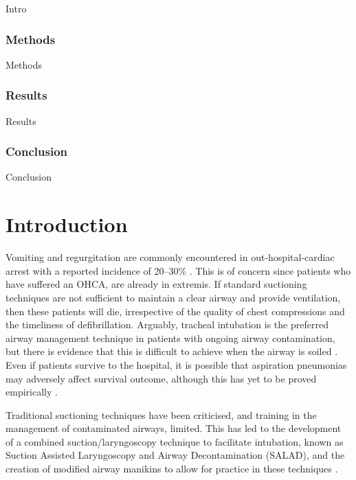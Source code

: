\documentclass[]{article}
\begin{document}
Intro

\hypertarget{methods}{%
\subsubsection{Methods}\label{methods}}

Methods

\hypertarget{results}{%
\subsubsection{Results}\label{results}}

Results

\hypertarget{conclusion}{%
\subsubsection{Conclusion}\label{conclusion}}

Conclusion

\hypertarget{intro}{%
\section{Introduction}\label{intro}}

Vomiting and regurgitation are commonly encountered in
out-hospital-cardiac arrest with a reported incidence of 20--30\%
\citep{voss_how_2014, simons_incidence_2007}. This is of concern since
patients who have suffered an OHCA, are already in extremis. If standard
suctioning techniques are not sufficient to maintain a clear airway and
provide ventilation, then these patients will die, irrespective of the
quality of chest compressions and the timeliness of defibrillation.
Arguably, tracheal intubation is the preferred airway management
technique in patients with ongoing airway contamination, but there is
evidence that this is difficult to achieve when the airway is soiled
\citep{sakles_impact_2017}. Even if patients survive to the hospital, it
is possible that aspiration pneumonias may adversely affect survival
outcome, although this has yet to be proved empirically
\citep{christ_early-onset_2016}.

Traditional suctioning techniques have been criticised, and training in
the management of contaminated airways, limited. This has led to the
development of a combined suction/laryngoscopy technique to facilitate
intubation, known as Suction Assisted Laryngoscopy and Airway
Decontamination (SALAD), and the creation of modified airway manikins to
allow for practice in these techniques \citep{ducanto_novel_2017}.
\end{document}
